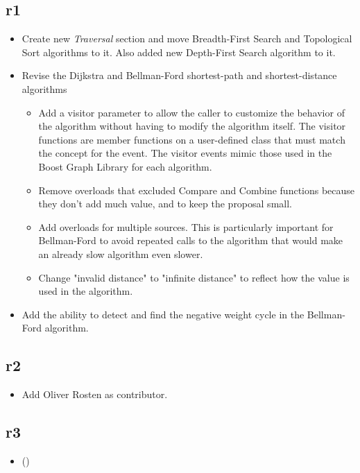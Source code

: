 \subsection*{\paperno r1}
\begin{itemize}
      \item Create new \textit{Traversal} section and move Breadth-First Search and Topological Sort algorithms to it.
            Also added new Depth-First Search algorithm to it.
      \item Revise the Dijkstra and Bellman-Ford shortest-path and shortest-distance algorithms
            \begin{itemize}
                  \item Add a visitor parameter to allow the caller to
                        customize the behavior of the algorithm without having to modify the algorithm itself.
                        The visitor functions are member functions on a user-defined class that must match the concept for the event.
                        The visitor events mimic those used in the Boost Graph Library for each algorithm.
                  \item Remove overloads that excluded Compare and Combine functions because they don't add much value,
                        and to keep the proposal small.
                  \item Add overloads for multiple sources. This is particularly important for Bellman-Ford to avoid
                        repeated calls to the algorithm that would make an already slow algorithm even slower.
                  \item Change "invalid distance" to "infinite distance" to reflect how the value is used 
                        in the algorithm.
            \end{itemize}
      \item Add the ability to detect and find the negative weight cycle in the Bellman-Ford algorithm.
\end{itemize}

\subsection*{\paperno r2}
\begin{itemize}
      \item Add Oliver Rosten as contributor.
\end{itemize}

\subsection*{\paperno r3}
\begin{itemize}
      \item ()
\end{itemize}
